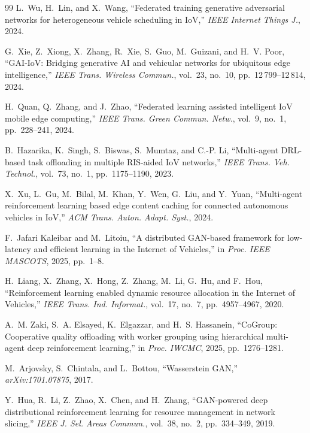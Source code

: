 \documentclass[journal]{IEEEtran}
\begin{document}
\begin{thebibliography}{99}
L.~Wu, H.~Lin, and X.~Wang, ``Federated training generative adversarial
networks for heterogeneous vehicle scheduling in IoV,'' \emph{IEEE Internet
Things J.}, 2024.

G.~Xie, Z.~Xiong, X.~Zhang, R.~Xie, S.~Guo, M.~Guizani, and H.~V. Poor,
``GAI-IoV: Bridging generative AI and vehicular networks for ubiquitous edge
intelligence,'' \emph{IEEE Trans. Wireless Commun.}, vol.~23, no.~10,
pp.~12\,799--12\,814, 2024.

H.~Quan, Q.~Zhang, and J.~Zhao, ``Federated learning assisted intelligent IoV
mobile edge computing,'' \emph{IEEE Trans. Green Commun. Netw.}, vol.~9, no.~1,
pp.~228--241, 2024.

B.~Hazarika, K.~Singh, S.~Biswas, S.~Mumtaz, and C.-P. Li, ``Multi-agent
DRL-based task offloading in multiple RIS-aided IoV networks,'' \emph{IEEE
Trans. Veh. Technol.}, vol.~73, no.~1, pp.~1175--1190, 2023.

X.~Xu, L.~Gu, M.~Bilal, M.~Khan, Y.~Wen, G.~Liu, and Y.~Yuan, ``Multi-agent
reinforcement learning based edge content caching for connected autonomous
vehicles in IoV,'' \emph{ACM Trans. Auton. Adapt. Syst.}, 2024.

F.~Jafari Kaleibar and M.~Litoiu, ``A distributed GAN-based framework for
low-latency and efficient learning in the Internet of Vehicles,'' in
\emph{Proc. IEEE MASCOTS}, 2025, pp.~1--8.

H.~Liang, X.~Zhang, X.~Hong, Z.~Zhang, M.~Li, G.~Hu, and F.~Hou,
``Reinforcement learning enabled dynamic resource allocation in the Internet
of Vehicles,'' \emph{IEEE Trans. Ind. Informat.}, vol.~17, no.~7,
pp.~4957--4967, 2020.

A.~M. Zaki, S.~A. Elsayed, K.~Elgazzar, and H.~S. Hassanein, ``CoGroup:
Cooperative quality offloading with worker grouping using hierarchical
multi-agent deep reinforcement learning,'' in \emph{Proc. IWCMC}, 2025,
pp.~1276--1281.

M.~Arjovsky, S.~Chintala, and L.~Bottou, ``Wasserstein GAN,''
\emph{arXiv:1701.07875}, 2017.

Y.~Hua, R.~Li, Z.~Zhao, X.~Chen, and H.~Zhang, ``GAN-powered deep
distributional reinforcement learning for resource management in network
slicing,'' \emph{IEEE J. Sel. Areas Commun.}, vol.~38, no.~2, pp.~334--349,
2019.


\end{thebibliography}
\end{document}
